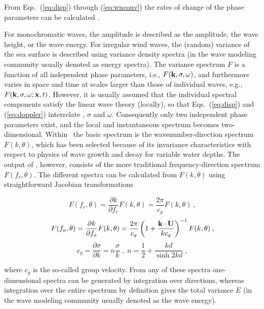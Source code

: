 \noindent
From Eqs.~(\ref{eq:disp}) through (\ref{eq:wnconv}) the rates of change of the
phase parameters can be calculated \citep[e.g.,][equations not reproduced
here]{rep:Chr82,bk:Mei83,tol:JPO90}.

For monochromatic waves, the amplitude is described as the amplitude, the wave
height, or the wave energy. For irregular wind waves, the (random) variance of
the sea surface is described using variance density spectra (in the wave
modeling community usually denoted as energy spectra). The variance spectrum
$F$ is a function of all independent phase parameters, i.e.,
$F({\mbox{\bf k}},\sigma,\omega)$, and furthermore varies in space and time at scales
larger than those of individual waves, e.g., $F({\mbox{\bf k}},\sigma,\omega
;\mbox{\bf x},t)$. However, it is usually assumed that the individual spectral
components satisfy the linear wave theory (locally), so that
Eqs.~(\ref{eq:disp}) and (\ref{eq:doppler}) interrelate {\bk}, $\sigma$ and
$\omega$. Consequently only two independent phase parameters exist, and the
local and instantaneous spectrum becomes two-dimensional. Within \ws\ the
basic spectrum is the wavenumber-direction spectrum $F(k,\theta)$, which has
been selected because of its invariance characteristics with respect to
physics of wave growth and decay for variable water depths. The output of \ws,
however, consists of the more traditional frequency-direction spectrum
$F(f_r,\theta)$. The different spectra can be calculated from $F(k,\theta)$
using straightforward Jacobian transformations


\begin{equation}
F(f_r,\theta) = \frac{\partial k}{\partial f_r} F(k,\theta) =
\frac{2\pi}{c_g} F(k,\theta) \: ,
\label{eq:jac_fr}
\end{equation}
\begin{equation}
F(f_a,\theta) = \frac{\partial k}{\partial f_a} F(k,\theta) =
\frac{2\pi}{c_g}
\left ( 1 + \frac{{\mbox{\bf k}}\cdot{\bf U}}{k c_g}\right )^{-1}
F(k,\theta) \: ,
\label{eq:jac_fa}
\end{equation}
\begin{equation}
c_g = \frac{\partial \sigma}{\partial k} = n \frac{\sigma}{k}
\; , \;
n = \frac{1}{2} + \frac{kd}{\sinh 2kd} \; ,
\label{eq:cg}
\end{equation}

\noindent 
where $c_g$ is the so-called group velocity.  From any of these spectra
one-dimensional spectra can be generated by integration over directions,
whereas integration over the entire spectrum by definition gives the total
variance $E$ (in the wave modeling community usually denoted as the wave
energy).

